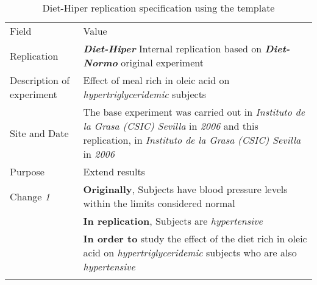 \begin{table*}[h]
  \caption{Diet-Hiper replication specification using the template}
\label{tab:rocio}
  \centering

\begin{tabularx}{\textwidth}{
  >{\hsize=0.25\hsize}X
  >{\hsize=0.8\hsize}X}
  
    \noalign{\smallskip}\hline\noalign{\smallskip}
  
  Field &  Value  \\ 
  \noalign{\smallskip}\hline\noalign{\smallskip}
 
 Replication &   \textbf{\emph{Diet-Hiper}}   Internal replication based on \textbf{\emph{Diet-Normo}}  original experiment   \\

 Description \newline of experiment &  Effect of  meal rich in oleic acid on \emph{hypertriglyceridemic} subjects \\  
 
 Site and Date & The base experiment was carried out in  \textit{Instituto de la Grasa (CSIC) Sevilla}  in  \textit{2006} and this replication, in  \textit{Instituto de la Grasa (CSIC) Sevilla} in \textit{2006}    \\
    Purpose  &  Extend results \\  
\hline   
    Change \textit{1}   & \textbf{Originally}, Subjects have blood pressure levels within the limits considered normal \\& \textbf{In replication}, Subjects are \emph{hypertensive}   \\& \textbf{In order to} study the effect of the diet rich in oleic acid on \emph{hypertriglyceridemic} subjects who are also \emph{hypertensive}   \\ 
    
	
   	\noalign{\smallskip\smallskip}\hline
	\end{tabularx}  
\end{table*}
